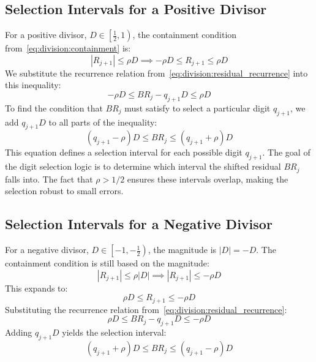 \documentclass{article}
\begin{document}
\subsection{Selection Intervals for a Positive Divisor}
\label{ssec:division:pos_divisor}
For a positive divisor, $D \in \left[\frac{1}{2}, 1\right)$, the containment condition from~\cref{eq:division:containment} is:
\begin{equation}
  \label{eq:division:containment_pos}
  \left| R_{j+1} \right| \leq \rho D \implies -\rho D \leq R_{j+1} \leq \rho D
\end{equation}
We substitute the recurrence relation from~\cref{eq:division:residual_recurrence} into this inequality:
\begin{equation}
  \label{eq:division:selection_sub_pos}
  -\rho D \leq B R_j - q_{j+1} D \leq \rho D
\end{equation}
To find the condition that $B R_j$ must satisfy to select a particular digit $q_{j+1}$, we add $q_{j+1} D$ to all parts of the inequality:
\begin{equation}
  \label{eq:division:selection_interval_pos}
  (q_{j+1} - \rho) D \leq B R_j \leq (q_{j+1} + \rho) D
\end{equation}
This equation defines a selection interval for each possible digit $q_{j+1}$.
The goal of the digit selection logic is to determine which interval the shifted residual $B R_j$ falls into.
The fact that $\rho > 1/2$ ensures these intervals overlap, making the selection robust to small errors.

\subsection{Selection Intervals for a Negative Divisor}
\label{ssec:division:neg_divisor}
For a negative divisor, $D \in \left[-1, -\frac{1}{2}\right)$, the magnitude is $|D| = -D$.
The containment condition is still based on the magnitude:
\begin{equation}
  \label{eq:division:containment_neg_mag}
  \left| R_{j+1} \right| \leq \rho |D| \implies \left| R_{j+1} \right| \leq -\rho D
\end{equation}
This expands to:
\begin{equation}
  \label{eq:division:containment_neg}
  \rho D \leq R_{j+1} \leq -\rho D
\end{equation}
Substituting the recurrence relation from~\cref{eq:division:residual_recurrence}:
\begin{equation}
  \label{eq:division:selection_sub_neg}
  \rho D \leq B R_j - q_{j+1} D \leq -\rho D
\end{equation}
Adding $q_{j+1} D$ yields the selection interval:
\begin{equation}
  \label{eq:division:selection_interval_neg}
  (q_{j+1} + \rho) D \leq B R_j \leq (q_{j+1} - \rho) D
\end{equation}
\end{document}
